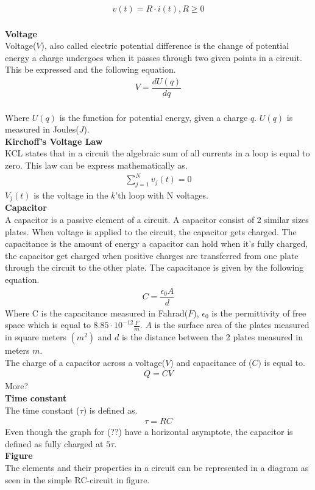 \begin{align}
v(t)=R\cdot i(t),  R\geq0
\end{align}
\\
\textbf{Voltage}
\\
Voltage($V$), also called electric potential difference is the change of potential energy a charge undergoes when it passes through two given points in a circuit. This be expressed and the following equation.
\begin{align}
V=\dfrac{dU(q)}{dq}
\end{align}
\\
Where $U(q)$ is the function for potential energy, given a charge $q$. $U(q)$ is measured in Joules($J$).
\\
\textbf{Kirchoff's Voltage Law}
\\
KCL states that in a circuit the algebraic sum of all currents in a loop is equal to zero. This law can be express mathematically  as.
\begin{align}
\sum_{j=1}^{N} v_{j}(t) = 0
\end{align}
$V_{j}(t)$ is the voltage in the $k$'th loop with N voltages.
\\
\textbf{Capacitor}
\\
A capacitor is a passive element of a circuit. A capacitor consist of 2 similar sizes plates. When voltage is applied to the circuit, the capacitor gets charged. The capacitance is the amount of energy a capacitor can hold when it's fully charged, the capacitor get charged when positive charges are transferred from one plate through the circuit to the other plate. The capacitance is given by the following equation.
\begin{align}
C=\dfrac{\epsilon_{0}A}{d}
\end{align}
Where C is the capacitance measured in Fahrad($F$), $\epsilon_{0}$ is the permittivity of free space which is equal to $8.85 \cdot 10^{-12}                                                 \frac{F}{m}$. $A$ is the surface area of the plates measured in square meters $(m^{2})$ and $d$ is the distance between the 2 plates measured in meters $m$.
\\
The charge of a capacitor across a voltage($V$) and capacitance of ($C)$ is equal to.
\begin{align}
Q=CV	
\end{align}
More?
\\
\textbf{Time constant}
\\
The time constant ($\tau$) is defined as.
\begin{align}
\tau = RC
\end{align}
Even though the graph for (??) have a horizontal asymptote, the capacitor is defined as fully charged at $5\tau$.
\\
\textbf{Figure}
\\
The elements and their properties in a circuit can be represented in a diagram as seen in the simple RC-circuit in  figure.